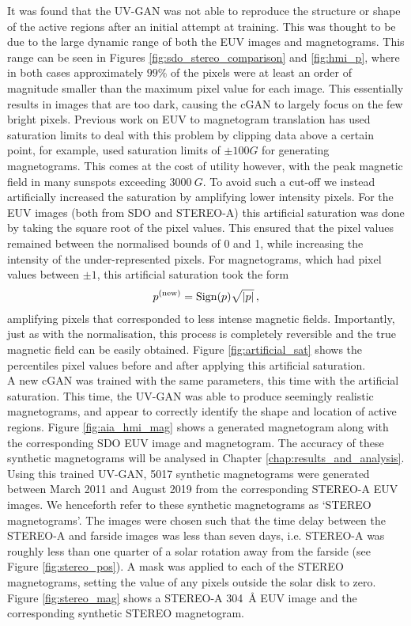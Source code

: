 \documentclass[11pt,a4paper,onecolumn]{report}
\begin{document}
It was found that the UV-GAN was not able to reproduce the structure or shape of
the active regions after an initial attempt at training. This was thought to be
due to the large dynamic range of both the EUV images and magnetograms. This
range can be seen in Figures \ref{fig:sdo_stereo_comparison} and
\ref{fig:hmi_p}, where in both cases approximately $99\%$ of the pixels were at
least an order of magnitude smaller than the maximum pixel value for each image.
This essentially results in images that are too dark, causing the cGAN to largely
focus on the few bright pixels. Previous work on EUV to magnetogram translation
has used saturation limits to deal with this problem by clipping data above a
certain point, for example, \citet{Kim2019} used saturation limits of $\pm 100G$
for generating magnetograms. This comes at the cost of utility however, with the
peak magnetic field in many sunspots exceeding $\SI[]{3000}[]{G}$. To avoid such
a cut-off we instead artificially increased the saturation by amplifying lower
intensity pixels. For the EUV images (both from SDO and STEREO-A) this
artificial saturation was done by taking the square root of the pixel values.
This ensured that the pixel values remained between the normalised bounds of
0 and 1, while increasing the intensity of the
under-represented pixels. For magnetograms, which had pixel values between
$\pm 1$, this artificial saturation took the form
\begin{align}
  p^{(\text{new})} = \text{Sign}(p)\sqrt{\absolutevalue{p}}\, ,
\end{align}
amplifying pixels that corresponded to less intense magnetic fields.
Importantly, just as with the normalisation, this process is completely
reversible and the true magnetic field can be easily obtained. Figure
\ref{fig:artificial_sat} shows the percentiles pixel values before and after
applying this artificial saturation. \\


A new cGAN was trained with the same parameters, this time with the artificial
saturation. This time, the UV-GAN was able to produce seemingly realistic
magnetograms, and appear to correctly identify the shape and location of active
regions. Figure \ref{fig:aia_hmi_mag} shows a generated magnetogram along with
the corresponding SDO EUV image and magnetogram. The accuracy of these synthetic
magnetograms will be analysed in Chapter \ref{chap:results_and_analysis}. \\


Using this trained UV-GAN, 5017 synthetic magnetograms were generated between
March 2011 and August 2019 from the corresponding STEREO-A EUV images. We
henceforth refer to these synthetic magnetograms as `STEREO magnetograms'. The
images were chosen such that the time delay between the STEREO-A and farside
images was less than seven days, i.e. STEREO-A was roughly less than one quarter
of a solar rotation away from the farside (see Figure \ref{fig:stereo_pos}). A
mask was applied to each of the STEREO magnetograms, setting the value of any
pixels outside the solar disk to zero. Figure \ref{fig:stereo_mag} shows a
STEREO-A \SI{304}{\angstrom} EUV image and the corresponding synthetic STEREO
magnetogram.
\end{document}
